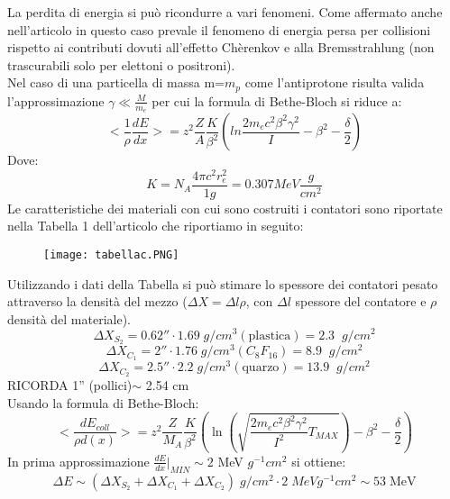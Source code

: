 \documentclass[twoside]{article}
\begin{document}
La perdita di energia si può ricondurre a vari fenomeni. Come affermato anche nell'articolo in questo caso prevale il fenomeno di energia persa per collisioni rispetto ai contributi dovuti all'effetto Chèrenkov e alla Bremsstrahlung (non trascurabili solo per elettoni o positroni).\\
Nel caso di una particella di massa m=$m_p$ come l'antiprotone risulta valida l'approssimazione $\gamma\ll \frac{M}{m_e}$
per cui la formula di Bethe-Bloch si riduce a:
\begin{equation}
    <\frac{1}{\rho}\frac{dE}{dx}>=z^2\frac{Z}{A}\frac{K}{\beta^2}\left(ln\frac{2m_ec^2\beta^2\gamma^2}{I}-\beta^2-\frac{\delta}{2}\right)
\end{equation}
Dove:
\begin{equation}
    K=N_A\frac{4 \pi c^2r_e^2}{1 g}=0.307 MeV\frac{g}{cm^2}
\end{equation}
Le caratteristiche dei materiali con cui sono costruiti i contatori sono riportate nella Tabella 1 dell'articolo che riportiamo in seguito:
\begin{figure}[H]
    \centering
    \texttt{[image: tabellac.PNG]}
    \label{fig:tabellac}
\end{figure}
Utilizzando i dati della Tabella si può stimare lo spessore dei contatori pesato attraverso la densità del mezzo ($\Delta X= \Delta l \rho $, con $\Delta l$ spessore del contatore e $\rho$ densità del materiale).
\begin{equation*}
    \Delta X_{S_2}=0.62''\cdot 1.69 \; g/cm^3(\text{plastica}) = 2.3 \;\; g/cm^2
\end{equation*}
\begin{equation*}
    \Delta X_{C_1}=2''\cdot 1.76 \; g/cm^3(C_8F_16) =8.9\;\; g/cm^2
\end{equation*}
\begin{equation*}
    \Delta X_{C_2}=2.5''\cdot 2.2 \; g/cm^3 (\text{quarzo}) = 13.9\;\; g/cm^2
\end{equation*}
RICORDA 1'' (pollici)$\sim$ 2.54 cm\\
Usando la formula di Bethe-Bloch:
\begin{equation}
    <\frac{dE_{coll}}{\rho d(x)}>= z^2 \frac{Z}{M_A}  \frac{K}{\beta^2} \left(\ln\left(\sqrt{\frac{2m_ec^2\beta^2\gamma^2}{I^2} T_{MAX}}\right)-\beta^2-\frac{\delta}{2}\right)
\end{equation}
In prima approssimazione $ \frac{dE}{dx}\bigg|_{MIN}\sim 2$ MeV $g^{-1} cm^2$ si ottiene:
\begin{equation}
    \Delta E \sim (\Delta X_{S_2}+\Delta X_{C_1}+\Delta X_{C_2})\;g/cm^2\cdot 2 \; MeV g^{-1} cm^2 \sim 53\; \text{MeV}
\end{equation}
\end{document}
